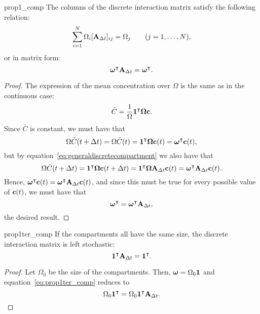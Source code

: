 \begin{propertyter}{prop1_comp} \label{prop1ter_comp} \label{prop2_discr_comp}
	The columns of the discrete interaction matrix satisfy the following relation:
	\begin{equation}
		\sum_{i=1}^N \Omega_i  [\mathbf A_{\Delta t}]_{ij} = \Omega_j \qquad (j=1,\dots,N),
	\end{equation}
	or in matrix form:
	\begin{equation}
		\boldsymbol \omega^\intercal \mathbf A_{\Delta t} = \boldsymbol \omega^\intercal .
	\end{equation}
\end{propertyter}
\begin{proof}
	The expression of the mean concentration over $\Omega$ is the same as in the continuous case:
	\begin{equation}
		\bar C = \frac{1}{\Omega} \mathbf 1^\intercal \boldsymbol \Omega \mathbf c.
	\end{equation}
	Since $\bar C$ is constant, we must have that
	\begin{equation}
		\Omega \bar C(t+\Delta t) = \Omega \bar C(t) = \mathbf1^\intercal \boldsymbol \Omega \mathbf c(t) = \boldsymbol \omega^\intercal \mathbf c(t),
	\end{equation}
	but by equation~\eqref{eq:generaldiscretecompartment} we also have that
	\begin{equation}
		\Omega \bar C(t+\Delta t) = \mathbf1^\intercal \boldsymbol \Omega \mathbf c(t+\Delta t) = \mathbf1^\intercal \boldsymbol \Omega \mathbf A_{\Delta t} \mathbf c(t) = \boldsymbol \omega^\intercal \mathbf A_{\Delta t} \mathbf c(t).
	\end{equation}
	Hence, $\boldsymbol \omega^\intercal \mathbf c(t) = \boldsymbol \omega^\intercal \mathbf A_{\Delta t} \mathbf c(t)$, and since this must be true for every possible value of $\mathbf c(t)$, we must have that
	\begin{equation} \label{eq:prop1ter_comp}
		\boldsymbol \omega^\intercal = \boldsymbol \omega^\intercal \mathbf A_{\Delta t},
	\end{equation}
	the desired result.
\end{proof}
\begin{corollary}{prop1ter_comp} \label{corollary2}
	If the compartments all have the same size, the discrete interaction matrix is  left stochastic:
	\begin{equation}
		\mathbf 1^\intercal \mathbf A_{\Delta t} = \mathbf 1^\intercal.
	\end{equation}
\end{corollary}
\begin{proof}
	Let $\Omega_0$ be the size of the compartments. Then, $\boldsymbol \omega = \Omega_0 \mathbf 1$ and equation~\eqref{eq:prop1ter_comp} reduces to
	\begin{equation}
		\Omega_0 \mathbf 1^\intercal = \Omega_0 \mathbf 1^\intercal \mathbf A_{\Delta t}.
	\end{equation}
\end{proof}

